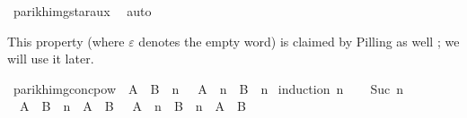\begin{isabellebody}
\ parikh{\isacharunderscore}{\kern0pt}img{\isacharunderscore}{\kern0pt}star{\isacharunderscore}{\kern0pt}aux{}\ \isamarkupfalse%
\ auto\isanewline
{}\isamarkupfalse%
%
\endisatagproof
{\isafoldproof}%
%
\isadelimproof
%
\endisadelimproof
%
\isadelimdocument
%
\endisadelimdocument
%
\isatagdocument
%
\isamarkuptrue%
%
\endisatagdocument
{\isafolddocument}%
%
\isadelimdocument
%
\endisadelimdocument
%
\begin{isamarkuptext}%
This property (where $\varepsilon$ denotes the empty word) is claimed by
Pilling as well \cite{Pilling}; we will use it later.%
\end{isamarkuptext}\isamarkuptrue%
\isamarkupfalse%
\ parikh{\isacharunderscore}{\kern0pt}img{\isacharunderscore}{\kern0pt}conc{\isacharunderscore}{\kern0pt}pow{\isacharcolon}{\kern0pt}\ {\isachardoublequoteopen}{\isasymPsi}\ {\isacharparenleft}{\kern0pt}{\isacharparenleft}{\kern0pt}A\ {\isacharat}{\kern0pt}{\isacharat}{\kern0pt}\ B{\isacharparenright}{\kern0pt}\ {\isacharcircum}{\kern0pt}{\isacharcircum}{\kern0pt}\ n{\isacharparenright}{\kern0pt}\ {\isasymsubseteq}\ {\isasymPsi}\ {\isacharparenleft}{\kern0pt}A\ {\isacharcircum}{\kern0pt}{\isacharcircum}{\kern0pt}\ n\ {\isacharat}{\kern0pt}{\isacharat}{\kern0pt}\ B\ {\isacharcircum}{\kern0pt}{\isacharcircum}{\kern0pt}\ n{\isacharparenright}{\kern0pt}{\isachardoublequoteclose}\isanewline
%
\isadelimproof
%
\endisadelimproof
%
\isatagproof
{}\isamarkupfalse%
\ {\isacharparenleft}{\kern0pt}induction\ n{\isacharparenright}{\kern0pt}\isanewline
\ \ \isamarkupfalse%
\ {\isacharparenleft}{\kern0pt}Suc\ n{\isacharparenright}{\kern0pt}\isanewline
\ \ \isamarkupfalse%
\ \isamarkupfalse%
\ {\isachardoublequoteopen}{\isasymPsi}\ {\isacharparenleft}{\kern0pt}{\isacharparenleft}{\kern0pt}A\ {\isacharat}{\kern0pt}{\isacharat}{\kern0pt}\ B{\isacharparenright}{\kern0pt}\ {\isacharcircum}{\kern0pt}{\isacharcircum}{\kern0pt}\ n\ {\isacharat}{\kern0pt}{\isacharat}{\kern0pt}\ A\ {\isacharat}{\kern0pt}{\isacharat}{\kern0pt}\ B{\isacharparenright}{\kern0pt}\ {\isasymsubseteq}\ {\isasymPsi}\ {\isacharparenleft}{\kern0pt}A\ {\isacharcircum}{\kern0pt}{\isacharcircum}{\kern0pt}\ n\ {\isacharat}{\kern0pt}{\isacharat}{\kern0pt}\ B\ {\isacharcircum}{\kern0pt}{\isacharcircum}{\kern0pt}\ n\ {\isacharat}{\kern0pt}{\isacharat}{\kern0pt}\ A\ {\isacharat}{\kern0pt}{\isacharat}{\kern0pt}\ B{\isacharparenright}{\kern0pt}{\isachardoublequoteclose}\isanewline

\end{isabellebody}
